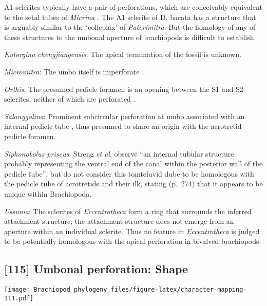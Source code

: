 \documentclass[openany]{book}
\theoremstyle{definition}
\theoremstyle{definition}
\theoremstyle{definition}
\theoremstyle{remark}
\begin{document}
A1 sclerites typically have a pair of perforations, which are
conceivably equivalent to the setal tubes of \emph{Micrina}
\citep{Holmer2011Firstrecord}. The A1 sclerite of D. bacata has a
structure that is arguably similar to the `colleplax' of
\emph{Paterimitra}. But the homology of any of these structures to the
umbonal aperture of brachiopods is difficult to establish.

\hypertarget{Kutorgina_chengjiangensis-coding-114}{}
\emph{Kutorgina chengjiangensis}: The apical termination of the fossil
is unknown.

\hypertarget{Micromitra-coding-114}{}
\emph{Micromitra}: The umbo itself is imperforate
\citep{Balthasar2004Shellstructure}.

\hypertarget{Orthis-coding-114}{}
\emph{Orthis}: The presumed pedicle foramen is an opening between the S1
and S2 sclerites, neither of which are perforated
\citep{Skovsted2009Thescleritome}.

\hypertarget{Salanygolina-coding-114}{}
\emph{Salanygolina}: Prominent subcircular perforation at umbo
associated with an internal pedicle tube \citep{Popov2009Earlyontogeny},
thus presumed to share an origin with the acrotretid pedicle foramen.

\hypertarget{Siphonobolus_priscus-coding-114}{}
\emph{Siphonobolus priscus}: Streng \emph{et al}.
\citeyearpar{Streng2016Anew} observe ``an internal tubular structure
probably representing the ventral end of the canal within the posterior
wall of the pedicle tube'', but do not consider this tomteluvid dube to
be homologous with the pedicle tube of acrotretids and their ilk,
stating (p.~274) that it appears to be unique within Brachiopoda.

\hypertarget{Ussunia-coding-114}{}
\emph{Ussunia}: The sclerites of \emph{Eccentrotheca} form a ring that
surrounds the inferred attachment structure; the attachment structure
does not emerge from an aperture within an individual sclerite. Thus no
feature in \emph{Eccentrotheca} is judged to be potentially homologous
with the apical perforation in bivalved brachiopods.

\subsection*{{[}115{]} Umbonal perforation:
Shape}\label{umbonal-perforation-shape}

\texttt{[image: Brachiopod\_phylogeny\_files/figure-latex/character-mapping-111.pdf]}
\end{document}
